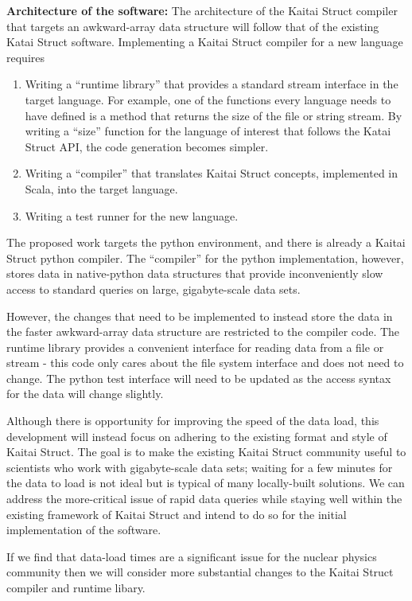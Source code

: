\textbf{Architecture of the software:}
The architecture of the Kaitai Struct compiler that targets an awkward-array data structure will follow that of the existing Katai Struct software.  Implementing a Kaitai Struct compiler for a new language requires

\begin{enumerate}
    \item Writing a ``runtime library'' that provides a standard stream interface in the target language.  For example, one of the functions every language needs to have defined is a method that returns the size of the file or string stream.  By writing a ``size'' function for the language of interest that follows the Katai Struct API, the code generation becomes simpler.
    \item Writing a ``compiler'' that translates Kaitai Struct concepts, implemented in Scala, into the target language.
    \item Writing a test runner for the new language. 
\end{enumerate}

The proposed work targets the python environment, and there is already a Kaitai Struct python compiler.  The ``compiler'' for the python implementation, however, stores data in native-python data structures that provide inconveniently slow access to standard queries on large, gigabyte-scale data sets.  

However, the changes that need to be implemented to instead store the data in the faster awkward-array data structure are restricted to the compiler code.  The runtime library provides a convenient interface for reading data from a file or stream - this code only cares about the file system interface and does not need to change.  The python test interface will need to be updated as the access syntax for the data will change slightly.

Although there is opportunity for improving the speed of the data load, this development will instead focus on adhering to the existing format and style of Kaitai Struct.  The goal is to make the existing Kaitai Struct community useful to scientists who work with gigabyte-scale data sets; waiting for a few minutes for the data to load is not ideal but is typical of many locally-built solutions.  We can address the more-critical issue of rapid data queries while staying well within the existing framework of Kaitai Struct and intend to do so for the initial implementation of the software.

If we find that data-load times are a significant issue for the nuclear physics community then we will consider more substantial changes to the Kaitai Struct compiler and runtime libary.

